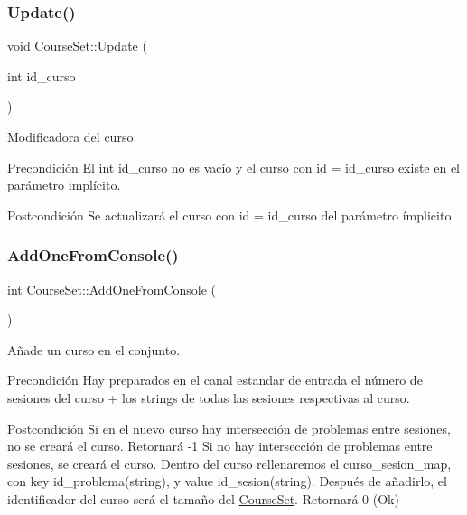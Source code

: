 \subsubsection{\texorpdfstring{Update()}{Update()}}
{\footnotesize\ttfamily void Course\+Set\+::\+Update (\begin{DoxyParamCaption}\item[{int}]{id\+\_\+curso }\end{DoxyParamCaption})}



Modificadora del curso. 

\begin{DoxyPrecond}{Precondición}
El int id\+\_\+curso no es vacío y el curso con id = id\+\_\+curso existe en el parámetro implícito. 
\end{DoxyPrecond}
\begin{DoxyPostcond}{Postcondición}
Se actualizará el curso con id = id\+\_\+curso del parámetro ímplicito. 
\end{DoxyPostcond}
\mbox{\label{class_course_set_ae74448a3ba72c104d4f35abf41d47b0e}} 
\subsubsection{\texorpdfstring{Add\+One\+From\+Console()}{AddOneFromConsole()}}
{\footnotesize\ttfamily int Course\+Set\+::\+Add\+One\+From\+Console (\begin{DoxyParamCaption}{ }\end{DoxyParamCaption})}



Añade un curso en el conjunto. 

\begin{DoxyPrecond}{Precondición}
Hay preparados en el canal estandar de entrada el número de sesiones del curso + los strings de todas las sesiones respectivas al curso. 
\end{DoxyPrecond}
\begin{DoxyPostcond}{Postcondición}
Si en el nuevo curso hay intersección de problemas entre sesiones, no se creará el curso. Retornará -\/1 Si no hay intersección de problemas entre sesiones, se creará el curso. Dentro del curso rellenaremos el curso\+\_\+sesion\+\_\+map, con key id\+\_\+problema(string), y value id\+\_\+sesion(string). Después de añadirlo, el identificador del curso será el tamaño del \mbox{\hyperlink{class_course_set}{Course\+Set}}. Retornará 0 (Ok) 
\end{DoxyPostcond}
\mbox{\label{class_course_set_ade38257bb2809e6b8a2b062796c69e53}} 
